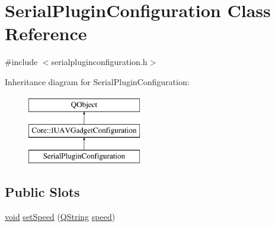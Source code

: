 \hypertarget{class_serial_plugin_configuration}{\section{Serial\-Plugin\-Configuration Class Reference}
\label{class_serial_plugin_configuration}
}


{\ttfamily \#include $<$serialpluginconfiguration.\-h$>$}

Inheritance diagram for Serial\-Plugin\-Configuration\-:\begin{figure}[H]
\begin{center}
\leavevmode
\includegraphics[height=3.000000cm]{class_serial_plugin_configuration}
\end{center}
\end{figure}
\subsection*{Public Slots}
\begin{DoxyCompactItemize}
\item 
\hyperlink{group___u_a_v_objects_plugin_ga444cf2ff3f0ecbe028adce838d373f5c}{void} \hyperlink{group___serial_plugin_ga6e476e94e24bb1f9bf91de3c99ff00fc}{set\-Speed} (\hyperlink{group___u_a_v_objects_plugin_gab9d252f49c333c94a72f97ce3105a32d}{Q\-String} \hyperlink{group___serial_plugin_ga1e6623a11c7e9c8e52411d2568dd4e7c}{speed})
\end{DoxyCompactItemize}
